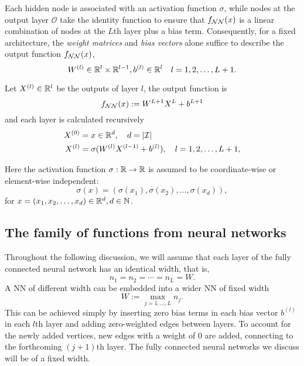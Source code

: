 Each hidden node is associated with an activation function $\sigma$, while nodes
at the output layer $\mathcal{O}$ take the identity function to ensure that
$f_{\mathcal{NN}}(x)$ is a linear combination of nodes at the $L$th layer plus a bias
term. Consequently, for a fixed architecture, the \textit{weight matrices} and
\textit{bias vectors} alone suffice to describe the output function
$f_{\mathcal{NN}}(x)$,
\begin{equation}
    W^{(l)} \in \mathbb{R}^l \times \mathbb{R}^{l-1}, b^{(l)} \in \mathbb{R}^l 
    \quad l = 1, 2, \dots, L+1.
\end{equation}

Let $X^{(l)} \in \mathbb{R}^l$ be the outputs of layer $l$, the output function
is 
\begin{equation}
    f_{\mathcal{NN}}(x) := W^{L+1} X^{L} + b^{L+1}
\end{equation}
and each layer is calculated recursively
\begin{align}
    X^{(0)} 
        &= x \in \mathbb{R}^d, \quad d = \left| \mathcal{I} \right| \\
    X^{(l)} 
        &= \sigma(W^{(l)} X^{(l-1)} + b^{(l)}), 
        \quad l = 1, 2, \dots, L+1, 
\end{align}

Here the activation function $\sigma: \mathbb{R} \to \mathbb{R}$ is assumed to be
coordinate-wise or element-wise independent:
\begin{equation*}
    \sigma(x) = (\sigma(x_1), \sigma(x_2), \dots, \sigma(x_d)),
\end{equation*}
for $x = (x_1, x_2, \dots, x_d) \in \mathbb{R}^d, d \in \mathbb{N}$.

\subsection{The family of functions from neural networks}

Throughout the following discussion, we will assume that each layer of the fully
connected neural network has an identical width, that is,
\begin{equation*}
    n_1 = n_2 = \cdots = n_L = W.
\end{equation*}
A NN of different width can be embedded into a wider NN of fixed width
$$
    W := \max_{j=1,\dots,L} n_j.
$$
This can be achieved simply by inserting zero bias terms in each bias vector
$b^{(l)}$ in each $l$th layer and adding zero-weighted edges between layers. To
account for the newly added vertices, new edges with a weight of $0$ are added,
connecting to the forthcoming $(j + 1)$th layer. The fully connected neural
networks we discuss will be of a fixed width.

